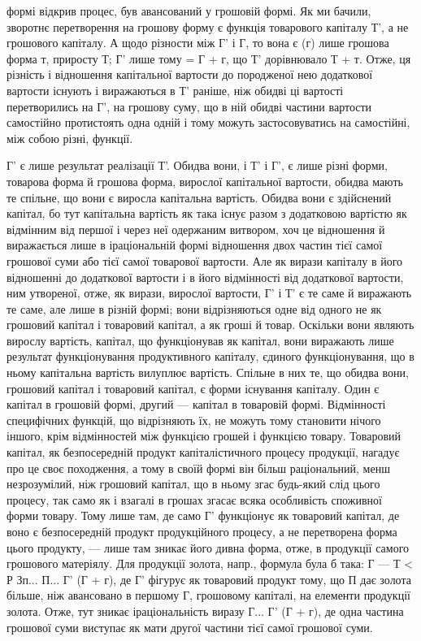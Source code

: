 \parcont{}  %
формі відкрив процес, був авансований у грошовій формі. Як ми бачили,
зворотнє перетворення на грошову форму є функція товарового капіталу
Т', а не грошового капіталу. А щодо різности між Г' і Г, то вона є (г)
лише грошова форма т, приросту Т; Г' лише тому = Г + г, що Т'
дорівнювало Т + т. Отже, ця різність і відношення капітальної вартости
до породженої нею додаткової вартости існують і виражаються в Т' раніше,
ніж обидві ці вартості перетворились на Г', на грошову суму, що в
ній обидві частини вартости самостійно протистоять одна одній і тому
можуть застосовуватись на самостійні, між собою різні, функції.

Г' є лише результат реалізації Т'. Обидва вони, і Т' і Г', є лише різні
форми, товарова форма й грошова форма, вирослої капітальної вартости,
обидва мають те спільне, що вони є виросла капітальна вартість. Обидва
вони є здійснений капітал, бо тут капітальна вартість як така існує разом
з додатковою вартістю як відмінним від першої і через неї одержаним
витвором, хоч це відношення й виражається лише в іраціональній
формі відношення двох частин тієї самої грошової суми або тієї самої
товарової вартости. Але як вирази капіталу в його відношенні до
додаткової вартости і в його відмінності від додаткової вартости, ним
утвореної, отже, як вирази, вирослої вартости, Г' і Т' є те саме й виражають
те саме, але лише в різній формі; вони відрізняються одне від одного
не як грошовий капітал і товаровий капітал, а як гроші й товар.
Оскільки вони являють вирослу вартість, капітал, що функціонував як
капітал, вони виражають лише результат функціонування продуктивного
капіталу, єдиного функціонування, що в ньому капітальна вартість вилуплює
вартість. Спільне в них те, що обидва вони, грошовий капітал і
товаровий капітал, є форми існування капіталу. Один є капітал в грошовій
формі, другий — капітал в товаровій формі. Відмінності специфічних
функцій, що відрізняють їх, не можуть тому становити нічого
іншого, крім відмінностей між функцією грошей і функцією товару. Товаровий
капітал, як безпосередній продукт капіталістичного процесу продукції,
нагадує про це своє походження, а тому в своїй формі
він більш раціональний, менш незрозумілий, ніж грошовий капітал,
що в ньому згас будь-який слід цього процесу, так само як і
взагалі в грошах згасає всяка особливість споживної форми товару. Тому
лише там, де само Г' функціонує як товаровий капітал, де воно
є безпосередній продукт продукційного процесу, а не перетворена
форма цього продукту, — лише там зникає його дивна форма, отже, в
продукції самого грошового матеріялу. Для продукції золота, напр., формула була б така: Г — Т < Р
Зп...  П... Г' (Г + г), де Г' фігурує як товаровий
продукт тому, що П дає золота більше, ніж авансовано в
першому Г, грошовому капіталі, на елементи продукції золота. Отже,
тут зникає іраціональність виразу Г... Г' (Г + г), де одна частина
грошової суми виступає як мати другої частини тієї самої грошової
суми.
